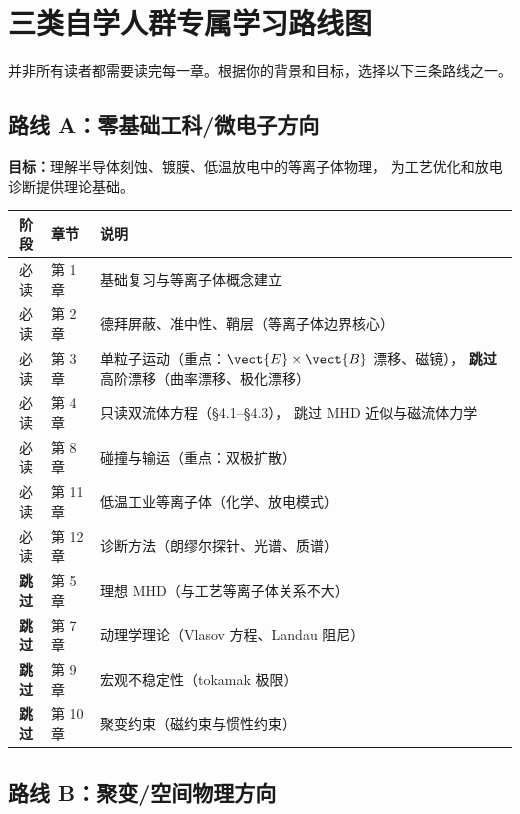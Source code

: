\section*{三类自学人群专属学习路线图}

并非所有读者都需要读完每一章。根据你的背景和目标，选择以下三条路线之一。


\subsection*{路线 A：零基础工科/微电子方向}

\textbf{目标：}理解半导体刻蚀、镀膜、低温放电中的等离子体物理，
为工艺优化和放电诊断提供理论基础。

\begin{table}[htbp]
\centering
\begin{tabular}{@{}clp{6cm}@{}}
\toprule
\textbf{阶段} & \textbf{章节} & \textbf{说明} \\
\midrule
必读 & 第 1 章 & 基础复习与等离子体概念建立 \\
必读 & 第 2 章 & 德拜屏蔽、准中性、鞘层（等离子体边界核心） \\
必读 & 第 3 章 & 单粒子运动（重点：$\vect{E}\times\vect{B}$ 漂移、磁镜），
\textbf{跳过}高阶漂移（曲率漂移、极化漂移） \\
必读 & 第 4 章 & 只读双流体方程（\S 4.1--\S 4.3），
跳过 MHD 近似与磁流体力学 \\
必读 & 第 8 章 & 碰撞与输运（重点：双极扩散） \\
必读 & 第 11 章 & 低温工业等离子体（化学、放电模式） \\
必读 & 第 12 章 & 诊断方法（朗缪尔探针、光谱、质谱） \\
\midrule
\textbf{跳过} & 第 5 章 & 理想 MHD（与工艺等离子体关系不大） \\
\textbf{跳过} & 第 7 章 & 动理学理论（Vlasov 方程、Landau 阻尼） \\
\textbf{跳过} & 第 9 章 & 宏观不稳定性（tokamak 极限） \\
\textbf{跳过} & 第 10 章 & 聚变约束（磁约束与惯性约束） \\
\bottomrule
\end{tabular}
\end{table}


\subsection*{路线 B：聚变/空间物理方向}

